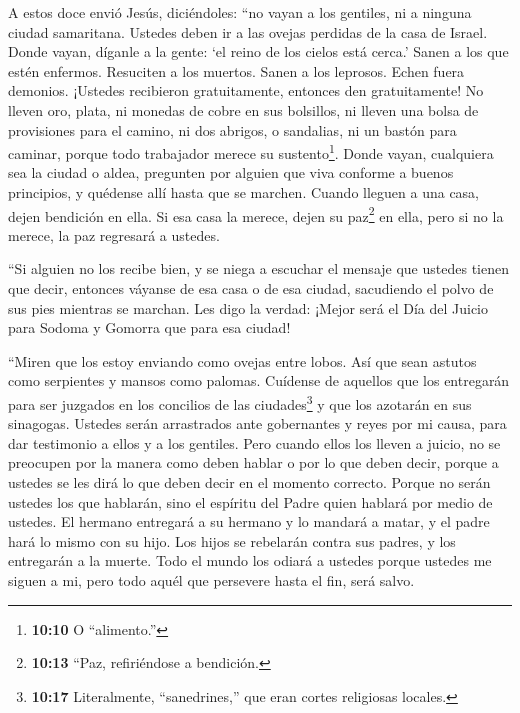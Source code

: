  A estos doce envió Jesús, diciéndoles: ``no vayan a los
gentiles, ni a ninguna ciudad samaritana.  Ustedes deben ir
a las ovejas perdidas de la casa de Israel.  Donde vayan,
díganle a la gente: `el reino de los cielos está cerca.' 
Sanen a los que estén enfermos. Resuciten a los muertos. Sanen a los
leprosos. Echen fuera demonios. ¡Ustedes recibieron gratuitamente,
entonces den gratuitamente!  No lleven oro, plata, ni
monedas de cobre en sus bolsillos,  ni lleven una bolsa de
provisiones para el camino, ni dos abrigos, o sandalias, ni un bastón
para caminar, porque todo trabajador merece su sustento\footnote{\textbf{10:10}
  O ``alimento.''}.  Donde vayan, cualquiera sea la ciudad
o aldea, pregunten por alguien que viva conforme a buenos principios, y
quédense allí hasta que se marchen.  Cuando lleguen a una
casa, dejen bendición en ella.  Si esa casa la merece,
dejen su paz\footnote{\textbf{10:13} ``Paz, refiriéndose a bendición.}
en ella, pero si no la merece, la paz regresará a ustedes.

 ``Si alguien no los recibe bien, y se niega a escuchar el
mensaje que ustedes tienen que decir, entonces váyanse de esa casa o de
esa ciudad, sacudiendo el polvo de sus pies mientras se marchan.
 Les digo la verdad: ¡Mejor será el Día del Juicio para
Sodoma y Gomorra que para esa ciudad!

 ``Miren que los estoy enviando como ovejas entre lobos.
Así que sean astutos como serpientes y mansos como palomas.
 Cuídense de aquellos que los entregarán para ser juzgados
en los concilios de las ciudades\footnote{\textbf{10:17} Literalmente,
  ``sanedrines,'' que eran cortes religiosas locales.} y que los
azotarán en sus sinagogas.  Ustedes serán arrastrados ante
gobernantes y reyes por mi causa, para dar testimonio a ellos y a los
gentiles.  Pero cuando ellos los lleven a juicio, no se
preocupen por la manera como deben hablar o por lo que deben decir,
porque a ustedes se les dirá lo que deben decir en el momento correcto.
 Porque no serán ustedes los que hablarán, sino el espíritu
del Padre quien hablará por medio de ustedes.  El hermano
entregará a su hermano y lo mandará a matar, y el padre hará lo mismo
con su hijo. Los hijos se rebelarán contra sus padres, y los entregarán
a la muerte.  Todo el mundo los odiará a ustedes porque
ustedes me siguen a mi, pero todo aquél que persevere hasta el fin, será
salvo.

